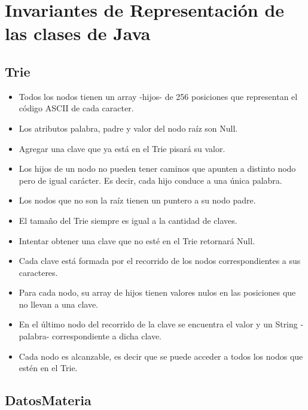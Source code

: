 \documentclass[10pt,a4paper]{article}
\begin{document}
\maketitle

\section{Invariantes de Representación de las clases de Java}



\subsection{Trie}

\begin{itemize}
	\item Todos los nodos tienen un array -hijos- de 256 posiciones que representan
	      el código ASCII de cada caracter.
	\item Los atributos palabra, padre y valor del nodo raíz son Null.
	\item Agregar una clave que ya está en el Trie pisará su valor.
	\item Los hijos de un nodo no pueden tener caminos que apunten a distinto nodo pero de igual carácter.
	      Es decir, cada hijo conduce a una única palabra.
	\item Los nodos que no son la raíz tienen un puntero a su nodo padre.
	\item El tamaño del Trie siempre es igual a la cantidad de claves.
	\item Intentar obtener una clave que no esté en el Trie retornará Null.
	\item Cada clave está formada por el recorrido de los nodos correspondientes a sus caracteres.
	\item Para cada nodo, su array de hijos tienen valores nulos en las posiciones que no llevan a una clave.
	\item En el último nodo del recorrido de la clave se encuentra el valor y un String -palabra-
	      correspondiente a dicha clave.
	\item Cada nodo es alcanzable, es decir que se puede acceder a todos los nodos que estén en el Trie.
\end{itemize}

\subsection{DatosMateria}
\end{document}
